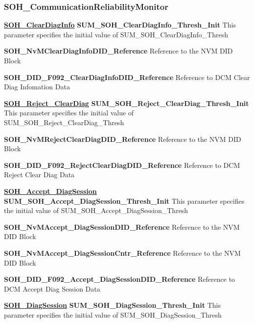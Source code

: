\subsubsection{SOH\_CommunicationReliabilityMonitor}

\textbf{\underline{SOH\_ClearDiagInfo}}\newline
\textbf{SUM\_SOH\_ClearDiagInfo\_Thresh\_Init}\newline
This parameter specifies the initial value of SUM\_SOH\_ClearDiagInfo\_Thresh

\textbf{SOH\_NvMClearDiagInfoDID\_Reference}\newline
Reference to the NVM DID Block

\textbf{SOH\_DID\_F092\_ClearDiagInfoDID\_Reference}\newline
Reference to DCM Clear Diag Infomation Data

\textbf{\underline{SOH\_Reject\_ClearDiag}}\newline
\textbf{SUM\_SOH\_Reject\_ClearDiag\_Thresh\_Init}\newline
This parameter specifies the initial value of SUM\_SOH\_Reject\_ClearDiag\_Thresh

\textbf{SOH\_NvMRejectClearDiagDID\_Reference}\newline
Reference to the NVM DID Block

\textbf{SOH\_DID\_F092\_RejectClearDiagDID\_Reference}\newline
Reference to DCM Reject Clear Diag Data

\textbf{\underline{SOH\_Accept\_DiagSession}}\newline
\textbf{SUM\_SOH\_Accept\_DiagSession\_Thresh\_Init}\newline
This parameter specifies the initial value of SUM\_SOH\_Accept\_DiagSession\_Thresh

\textbf{SOH\_NvMAccept\_DiagSessionDID\_Reference}\newline
Reference to the NVM DID Block

\textbf{SOH\_NvMAccept\_DiagSessionCntr\_Reference}\newline
Reference to the NVM DID Block

\textbf{SOH\_DID\_F092\_Accept\_DiagSessionDID\_Reference}\newline
Reference to DCM Accept Diag Session Data

\textbf{\underline{SOH\_DiagSession}}\newline
\textbf{SUM\_SOH\_DiagSession\_Thresh\_Init}\newline
This parameter specifies the initial value of SUM\_SOH\_DiagSession\_Thresh

